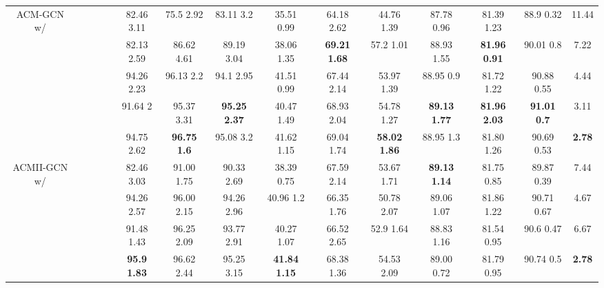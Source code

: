 \documentclass{article}
\newcommand{\0}{{\boldsymbol{0}}}
\newcommand{\6}{{\partial}}
\newcommand{\8}{{\infty}}
\newcommand{\4}{{\nabla}}
\begin{document}
\begin{table*}[htbp]
\begin{tabular}{c|cccc|ccccccccc|r}
    \multicolumn{1}{c|}{\multirow{5}[0]{*}{ACM-GCN w/}} &  &       &       &       & 82.46  3.11 & 75.5  2.92 & 83.11  3.2 & 35.51  0.99 & 64.18  2.62 & 44.76  1.39 & 87.78  0.96 & 81.39  1.23 & 88.9  0.32 & \multicolumn{1}{c}{11.44} \\
          &  &  &       &  & 82.13  2.59 & 86.62  4.61 & 89.19  3.04 & 38.06  1.35 & \cellcolor[rgb]{ .816,  .808,  .808}\textbf{69.21  1.68} & 57.2  1.01 & 88.93  1.55 & \cellcolor[rgb]{ .816,  .808,  .808}\textbf{81.96  0.91} & 90.01  0.8  & \multicolumn{1}{c}{7.22} \\
          &  &       &  &  & 94.26  2.23 & 96.13  2.2 & 94.1  2.95 & 41.51  0.99 & 67.44  2.14 & 53.97  1.39 & 88.95  0.9 & 81.72  1.22 & 90.88  0.55 & \multicolumn{1}{c}{4.44} \\
          &  &  &  &       & 91.64  2 & 95.37  3.31 & \cellcolor[rgb]{ .816,  .808,  .808}\textbf{95.25  2.37} & 40.47  1.49 & 68.93  2.04 & 54.78  1.27 & \cellcolor[rgb]{ .816,  .808,  .808}\textbf{89.13  1.77} & \cellcolor[rgb]{ .816,  .808,  .808}\textbf{81.96  2.03} & \cellcolor[rgb]{ .816,  .808,  .808}\textbf{91.01  0.7} & \multicolumn{1}{c}{3.11} \\
          &  &  &  &  & 94.75  2.62 & \cellcolor[rgb]{ .816,  .808,  .808}\textbf{96.75  1.6} & 95.08  3.2 & 41.62  1.15 & 69.04  1.74 & \cellcolor[rgb]{ .816,  .808,  .808}\textbf{58.02  1.86} & 88.95  1.3 & 81.80  1.26 & 90.69  0.53 & \multicolumn{1}{c}{\cellcolor[rgb]{ .816,  .808,  .808}\textbf{2.78}} \\
          \midrule
    \multicolumn{1}{c|}{\multirow{4}[1]{*}{ACMII-GCN w/}} &  &  &       &  & 82.46  3.03 & 91.00  1.75 & 90.33  2.69 & 38.39  0.75 & 67.59  2.14 & 53.67  1.71 & \cellcolor[rgb]{ .816,  .808,  .808}\textbf{89.13  1.14} & 81.75  0.85 & 89.87  0.39 & \multicolumn{1}{c}{7.44} \\
          &  &       &  &  & 94.26  2.57 & 96.00  2.15 & 94.26  2.96 & 40.96  1.2 & 66.35  1.76 & 50.78  2.07 & 89.06  1.07 & 81.86  1.22 & 90.71  0.67 & \multicolumn{1}{c}{4.67} \\
          &  &  &  &       & 91.48  1.43 & 96.25  2.09 & 93.77  2.91 & 40.27  1.07 & 66.52  2.65 & 52.9  1.64 & 88.83  1.16 & 81.54  0.95 & 90.6  0.47 & \multicolumn{1}{c}{6.67} \\
          &  &  &  &  & \cellcolor[rgb]{ .816,  .808,  .808}\textbf{95.9  1.83} & 96.62  2.44 & 95.25  3.15 & \cellcolor[rgb]{ .816,  .808,  .808}\textbf{41.84  1.15} & 68.38  1.36 & 54.53  2.09 & 89.00  0.72 & 81.79  0.95 & 90.74  0.5 & \multicolumn{1}{c}{\cellcolor[rgb]{ .816,  .808,  .808}\textbf{2.78}} \\

\end{tabular}
\end{table*}
\end{document}
